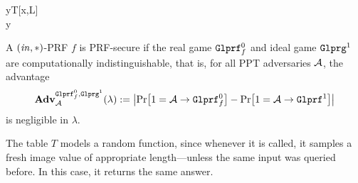 \begin{security}
\begin{codebox}
\begin{center}
\begin{pchstack}
\begin{pcvstack}
{				y\gets T[x,L]\\
        \pcreturn y}
		\end{pcvstack}
	\end{pchstack}
	\end{center}
\end{codebox}
\vspace{5mm}
A $(\mathit{in},*)$-PRF $f$ is PRF-secure if the real game $\text{\texttt{Glprf}}_f^0$ and ideal game $\text{\texttt{Glprg}}^1$ are computationally indistinguishable, that is, for all PPT adversaries $\mathcal{A}$, the advantage
\[\mathbf{Adv}_{\adv}^{
  \M{Glprf}_f^0,
  \M{Glprg}^1}
	(\lambda) 
	:=\abs{\prob{1=\adv\circ \M{Glprf}_f^0}-\prob{1=\adv\circ \M{Glprf}^1}}	\]
is negligible in $\lambda$.
\end{security}


\begin{remark}
The table $T$ models a random function, since whenever it is called, it samples a fresh image value of appropriate length---unless the same input was queried before. In this case, it returns the same answer.
\end{remark}